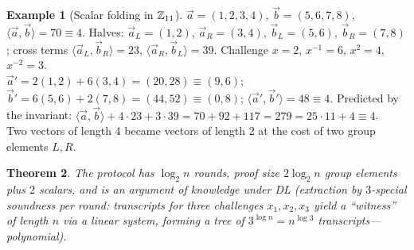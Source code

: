 \documentclass[11pt,a4paper]{report}
\theoremstyle{plain}
\newtheorem{theorem}{Theorem}[chapter]
\theoremstyle{definition}
\newtheorem{example}[theorem]{Example}
\theoremstyle{remark}
\newcommand{\inv}{^{-1}}
\begin{document}
\begin{example}[Scalar folding in $\mathbb{Z}_{11}$]
$\vec a=(1,2,3,4)$, $\vec b=(5,6,7,8)$, $\langle\vec a,\vec b\rangle=70\equiv4$. Halves: $\vec a_L=(1,2)$, $\vec a_R=(3,4)$, $\vec b_L=(5,6)$, $\vec b_R=(7,8)$; cross terms $\langle\vec a_L,\vec b_R\rangle=23$, $\langle\vec a_R,\vec b_L\rangle=39$. Challenge $x=2$, $x\inv=6$, $x^2=4$, $x^{-2}=3$.\\
$\vec a'=2(1,2)+6(3,4)=(20,28)\equiv(9,6)$; $\vec b'=6(5,6)+2(7,8)=(44,52)\equiv(0,8)$; $\langle\vec a',\vec b'\rangle=48\equiv4$. Predicted by the invariant: $\langle\vec a,\vec b\rangle+4\cdot23+3\cdot39=70+92+117=279=25\cdot11+4\equiv4$. \checkmark\\
Two vectors of length 4 became vectors of length 2 at the cost of two group elements $L,R$.
\end{example}
\begin{theorem}
The protocol has $\log_2n$ rounds, proof size $2\log_2n$ group elements plus $2$ scalars, and is an argument of knowledge under DL (extraction by $3$-special soundness per round: transcripts for three challenges $x_1,x_2,x_3$ yield a ``witness'' of length $n$ via a linear system, forming a tree of $3^{\log n}=n^{\log3}$ transcripts---polynomial).
\end{theorem}
\end{document}
